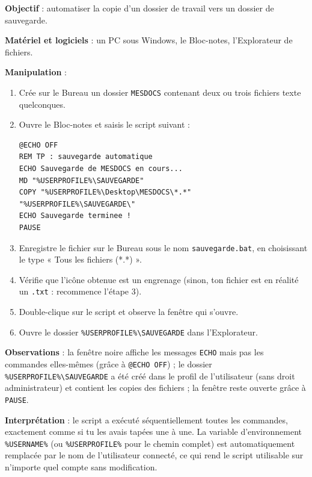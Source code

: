 \documentclass[11pt]{article}
\begin{document}
\begin{experience}
\textbf{Objectif} : automatiser la copie d'un dossier de travail vers un dossier de sauvegarde.

\textbf{Matériel et logiciels} : un PC sous Windows, le Bloc-notes, l'Explorateur de fichiers.

\textbf{Manipulation} :
\begin{enumerate}
  \item Crée sur le Bureau un dossier \texttt{MESDOCS} contenant deux ou trois fichiers texte quelconques.
  \item Ouvre le Bloc-notes et saisis le script suivant :
\begin{lstlisting}
@ECHO OFF
REM TP : sauvegarde automatique
ECHO Sauvegarde de MESDOCS en cours...
MD "%USERPROFILE%\SAUVEGARDE"
COPY "%USERPROFILE%\Desktop\MESDOCS\*.*" "%USERPROFILE%\SAUVEGARDE\"
ECHO Sauvegarde terminee !
PAUSE
\end{lstlisting}
  \item Enregistre le fichier sur le Bureau sous le nom \texttt{sauvegarde.bat}, en choisissant le type « Tous les fichiers (*.*) ».
  \item Vérifie que l'icône obtenue est un engrenage (sinon, ton fichier est en réalité un \texttt{.txt} : recommence l'étape 3).
  \item Double-clique sur le script et observe la fenêtre qui s'ouvre.
  \item Ouvre le dossier \texttt{\%USERPROFILE\%\textbackslash SAUVEGARDE} dans l'Explorateur.
\end{enumerate}

\textbf{Observations} : la fenêtre noire affiche les messages \texttt{ECHO} mais pas les commandes elles-mêmes (grâce à \texttt{@ECHO OFF}) ; le dossier \texttt{\%USERPROFILE\%\textbackslash SAUVEGARDE} a été créé dans le profil de l'utilisateur (sans droit administrateur) et contient les copies des fichiers ; la fenêtre reste ouverte grâce à \texttt{PAUSE}.

\textbf{Interprétation} : le script a exécuté séquentiellement toutes les commandes, exactement comme si tu les avais tapées une à une. La variable d'environnement \texttt{\%USERNAME\%} (ou \texttt{\%USERPROFILE\%} pour le chemin complet) est automatiquement remplacée par le nom de l'utilisateur connecté, ce qui rend le script utilisable sur n'importe quel compte sans modification.
\end{experience}
\end{document}
